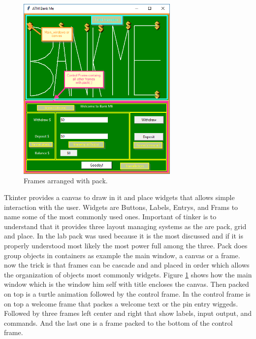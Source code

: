 \begin{figure}
	\centering
	\includegraphics[width=0.7\textwidth]{01_images/frames.PNG}
	\caption{Frames arranged with pack.}
	\label{fig: frames}
\end{figure}
Tkinter provides a canvas to draw in it and place widgets that allows simple interaction with the user. Widgets are Buttons, Labels, Entrys, and Frams to name some of the most commonly used ones. Important of tinker is to understand that it provides three layout managing systems as the are pack, grid and place. In the lab pack was used because it is the most discussed and if it is properly understood most likely the most power full among the three. Pack does group objects in containers as example the main window, a canvas or a frame. now the trick is that frames can be cascade and and placed in order which allows the organization of objects most commonly widgets. Figure \ref{fig: frames} shows how the main window which is the window him self with title encloses the canvas. Then packed on top is a turtle animation followed by the control frame. In the control frame is on top a welcome frame that packes a welcome text or the pin entry wiggeds. Followed by three frames left center and right that show labels, input output, and commands. And the last one is a frame packed to the bottom of the control frame.

